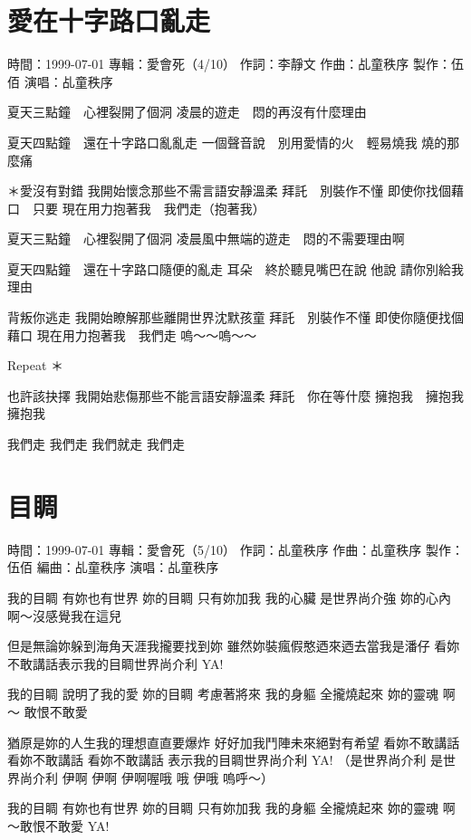 \documentclass[UTF8,a4paper,oneside,twocolumn,12pt]{ctexbook}
\newcommand{\infopair}[2]{\textbullet #1：#2}
\newcommand{\zc}[1][伍佰]{\infopair{作詞}{#1}}
\newcommand{\zq}[1][伍佰]{\infopair{作曲}{#1}}
\newcommand{\bq}[1][伍佰]{\infopair{編曲}{#1}}
\newcommand{\zj}[1]{\infopair{專輯}{#1}}
\newcommand{\zz}[1]{\infopair{製作}{#1}}
\newcommand{\sj}[1]{\infopair{時間}{#1}}
\newenvironment{info}{\begin{flushleft}\kaishu
	}
	{\end{flushleft}\normalsize\yahei\par}
\newenvironment{lyric}{
	}
{}
\begin{document}
\section{愛在十字路口亂走}
\begin{info}
	\sj{1999-07-01}
	\zj{愛會死（4/10）}
	\zc[李靜文]
	\zq[乩童秩序]
	\zz{伍佰}
	\infopair{演唱}{乩童秩序}
\end{info}
\begin{lyric}
	夏天三點鐘　心裡裂開了個洞
	凌晨的遊走　悶的再沒有什麼理由

	夏天四點鐘　還在十字路口亂亂走
	一個聲音說　別用愛情的火　輕易燒我
	燒的那麼痛

	＊愛沒有對錯
	我開始懷念那些不需言語安靜溫柔
	拜託　別裝作不懂
	即使你找個藉口　只要
	現在用力抱著我　我們走（抱著我）

	夏天三點鐘　心裡裂開了個洞
	凌晨風中無端的遊走　悶的不需要理由啊

	夏天四點鐘　還在十字路口隨便的亂走
	耳朵　終於聽見嘴巴在說
	他說  請你別給我理由

	背叛你逃走
	我開始瞭解那些離開世界沈默孩童
	拜託　別裝作不懂
	即使你隨便找個藉口
	現在用力抱著我　我們走
	嗚～～嗚～～

	Repeat ＊

	也許該抉擇
	我開始悲傷那些不能言語安靜溫柔
	拜託　你在等什麼
	擁抱我　擁抱我　擁抱我

	我們走 我們走  我們就走  我們走
\end{lyric}

\section{目睭}
\begin{info}
	\sj{1999-07-01}
	\zj{愛會死（5/10）}
	\zc[乩童秩序]
	\zq[乩童秩序]
	\zz{伍佰}
	\bq[乩童秩序]
	\infopair{演唱}{乩童秩序}
\end{info}
\begin{lyric}
	我的目睭 有妳也有世界 妳的目睭 只有妳加我
	我的心臟 是世界尚介強 妳的心內 啊～沒感覺我在這兒

	但是無論妳躲到海角天涯我攏要找到妳 雖然妳裝瘋假憨迺來迺去當我是潘仔
	看妳不敢講話表示我的目睭世界尚介利 YA!

	我的目睭 說明了我的愛 妳的目睭 考慮著將來
	我的身軀 全攏燒起來 妳的靈魂 啊～ 敢恨不敢愛

	猶原是妳的人生我的理想直直要爆炸 好好加我鬥陣未來絕對有希望
	看妳不敢講話 看妳不敢講話 看妳不敢講話 表示我的目睭世界尚介利 YA!
	（是世界尚介利 是世界尚介利 伊啊 伊啊 伊啊喔哦 哦 伊哦 嗚呼～）

	我的目睭 有妳也有世界 妳的目睭 只有妳加我
	我的身軀 全攏燒起來 妳的靈魂 啊～敢恨不敢愛 YA!
\end{lyric}
\end{document}
